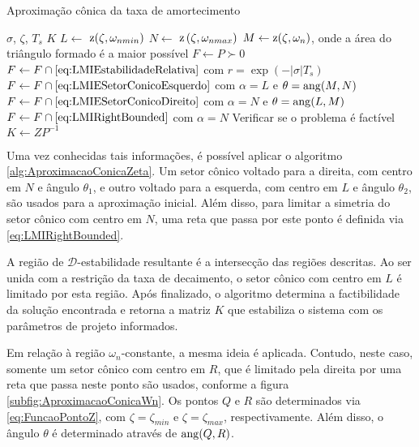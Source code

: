 \begin{algorithm}[ht!]
\caption{Aproximação cônica da taxa de amortecimento}\label{alg:AproximacaoConicaZeta}
\begin{algorithmic}[1]
\Require $\sigma$, $\zeta$, $T_s$
\Ensure $K$
\State $L \gets $ $\operatorname{\mathrm{z}}(\zeta,\omega_{nmin})$
\State $N \gets $ $\operatorname{\mathrm{z}}\left(\zeta,\omega_{nmax}\right)$
\State $M \gets \operatorname{\mathrm{z}}(\zeta,\omega_n)$, onde a área do triângulo formado é a maior possível
\State $F \gets P \succ 0$
\State $F \gets F \cap \eqref{eq:LMIEstabilidadeRelativa}$ com $r = \exp{\left(-|\sigma|T_s\right)}$ 
\State $F \gets F \cap \eqref{eq:LMIESetorConicoEsquerdo}$ com $\alpha = L$ e $\theta = \operatorname{ang}(M,N)$ 
\State $F \gets F \cap \eqref{eq:LMIESetorConicoDireito}$ com $\alpha = N$ e $\theta = \operatorname{ang}(L,M)$ 
\State $F \gets F \cap \eqref{eq:LMIRightBounded}$ com $\alpha = N$ 
\State Verificar se o problema é factível
\State $K \gets ZP^{-1}$
\end{algorithmic}
\end{algorithm}

Uma vez conhecidas tais informações, é possível aplicar o algoritmo \ref{alg:AproximacaoConicaZeta}. Um setor cônico voltado para a direita, com centro em $N$ e ângulo $\theta_1$, e outro voltado para a esquerda, com centro em $L$ e ângulo $\theta_2$, são usados para a aproximação inicial. Além disso, para limitar a simetria do setor cônico com centro em $N$, uma reta que passa por este ponto é definida via \eqref{eq:LMIRightBounded}.

A região de $\mathscr{D}$-estabilidade resultante é a intersecção das regiões descritas. Ao ser unida com a restrição da taxa de decaimento, o setor cônico com centro em $L$ é limitado por esta região. Após finalizado, o algoritmo determina a factibilidade da solução encontrada e retorna a matriz $K$ que estabiliza o sistema com os parâmetros de projeto informados.

Em relação à região $\omega_n$-constante, a mesma ideia é aplicada\cite{CHIQUETO2021}. Contudo, neste caso, somente um setor cônico com centro em $R$, que é limitado pela direita por uma reta que passa neste ponto são usados, conforme a figura \ref{subfig:AproximacaoConicaWn}. Os pontos $Q$ e $R$ são determinados via \eqref{eq:FuncaoPontoZ}, com $\zeta = \zeta_{min}$ e $\zeta = \zeta_{max}$, respectivamente. Além disso, o ângulo $\theta$ é determinado através de $\operatorname{ang}(Q,R)$.


